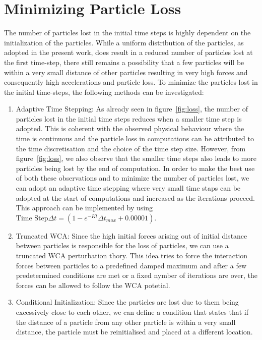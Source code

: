 \documentclass[11pt, oneside]{article}
\begin{document}
\section{Minimizing Particle Loss}
The number of particles lost in the initial time steps is highly dependent on the initialization of the particles. While a uniform distribution of the particles, as adopted in the present work,  does result in a reduced number of particles lost at the first time-step, there still remains a possibility that a few particles will be within a very small distance of other particles resulting in very high forces and consequently high accelerations and particle loss. To minimize the particles lost in the initial time-steps, the following methods can be investigated:
\begin{enumerate}
\item {Adaptive Time Stepping:} \quad As already seen in figure~\ref{fig:loss}, the number of particles lost in the initial time steps reduces when a smaller time step is adopted. This is coherent with the observed physical behaviour where the time is continuous and the particle loss in computations can be attributed to the time discretisation and the choice of the time step size. However, from figure~\ref{fig:loss}, we also observe that the smaller time steps also leads to more particles being lost by the end of computation. In order to make the best use of both these observations and to minimize the number of particles lost, we can adopt an adaptive time stepping where very small time staps can be adopted at the start of computations and increased as the iterations proceed. This approach can be implemented by using $\text{Time Step} \Delta t = (1 - e^{-Kt} \Delta t_{max} + 0.00001)$.
\item{Truncated WCA:} \quad Since the high initial forces arising out of initial distance between particles is responsible for the loss of particles, we can use a truncated WCA perturbation thory. This idea tries to force the interaction forces between particles to a predefined damped maximum and after a few  predetermined conditions are met or a fixed nymber of iterations are over, the forces can be allowed to follow the WCA potetial.
  \item{Conditional Initialization}: Since the particles are lost due to them being excessively close to each other, we can define a condition that states that if the distance of a particle from any other particle is within a very small distance, the particle must be reinitialised and placed at a different location.
\end{enumerate}
\end{document}
